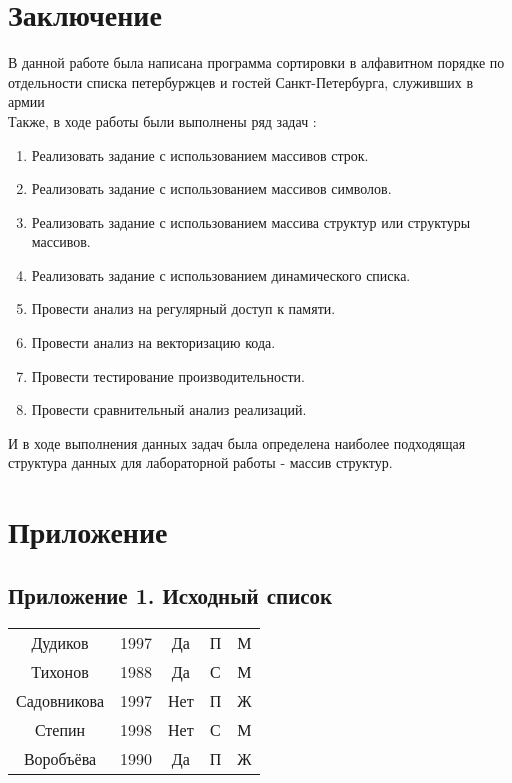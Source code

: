 \documentclass[12pt, a4paper]{report}
\begin{document}
\newpage







\newpage
{}
\section*{Заключение}
В данной работе была написана программа сортировки в алфавитном порядке по отдельности списка петербуржцев и гостей Санкт-Петербурга, служивших в армии \\
Также, в ходе работы были выполнены ряд задач :   
\begin{enumerate}
    \item Реализовать задание с использованием массивов строк.
    \item Реализовать задание с использованием массивов символов.
    \item Реализовать задание с использованием массива структур или структуры массивов.  
    \item Реализовать задание с использованием динамического списка.
    \item Провести анализ на регулярный доступ к памяти.
    \item Провести анализ на векторизацию кода.
    \item Провести тестирование производительности.
    \item Провести сравнительный анализ реализаций.
\end{enumerate}
И в ходе выполнения данных задач была определена наиболее подходящая структура данных для лабораторной работы - массив структур. 
\newpage


\section*{Приложение}
\subsection*{Приложение 1. Исходный список}
\begin{tabular}{ccccc}
Дудиков & 1997 & Да & П & М \\
Тихонов &1988 & Да &  С & М \\ 
Садовникова & 1997 & Нет & П & Ж \\ 
Степин & 1998 &  Нет & С & М \\ 
Воробъёва &1990 & Да &  П & Ж \\ 
\end{tabular} \\
\end{document}
